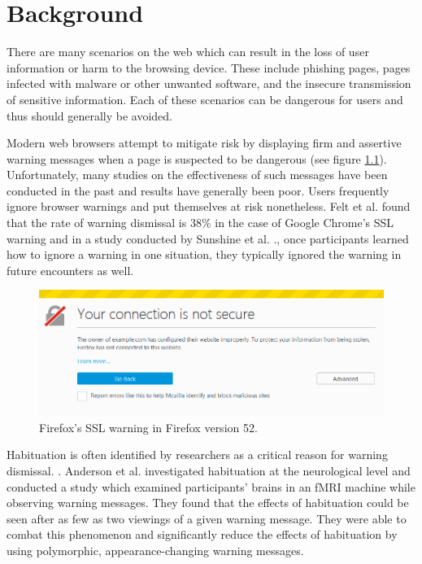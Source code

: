 \chapter{Background}
\label{Background}
There are many scenarios on the web which can result in the loss of user information or harm to the browsing device. These include phishing pages, pages infected with malware or other unwanted software, and the insecure transmission of sensitive information. Each of these scenarios can be dangerous for users and thus should generally be avoided.

Modern web browsers attempt to mitigate risk by displaying firm and assertive warning messages when a page is suspected to be dangerous (see figure \ref{fig:Warning-Firefox-SSL}). Unfortunately, many studies on the effectiveness of such messages have been conducted in the past and results have generally been poor. Users frequently ignore browser warnings and put themselves at risk nonetheless. Felt et al. \cite{felt2015improving} found that the rate of warning dismissal is 38\% in the case of Google Chrome’s SSL warning and in a study conducted by Sunshine et al. \cite{sunshine2009crying}., once participants learned how to ignore a warning in one situation, they typically ignored the warning in future encounters as well.

\begin{figure}[th]
	\centering
	\includegraphics[width=\textwidth]{Figures/Warning-Firefox-SSL}
	\decoRule
	\caption[Firefox's SSL warning]{Firefox's SSL warning in Firefox version 52.}
	\label{fig:Warning-Firefox-SSL}
\end{figure}

Habituation is often identified by researchers as a critical reason for warning dismissal. \cite{akhawe2013alice, egelman2008warned}. Anderson et al. \cite{anderson2015polymorphic} investigated habituation at the neurological level and conducted a study which examined participants' brains in an fMRI machine while observing warning messages. They found that the effects of habituation could be seen after as few as two viewings of a given warning message. They were able to combat this phenomenon and significantly reduce the effects of habituation by using polymorphic, appearance-changing warning messages.

